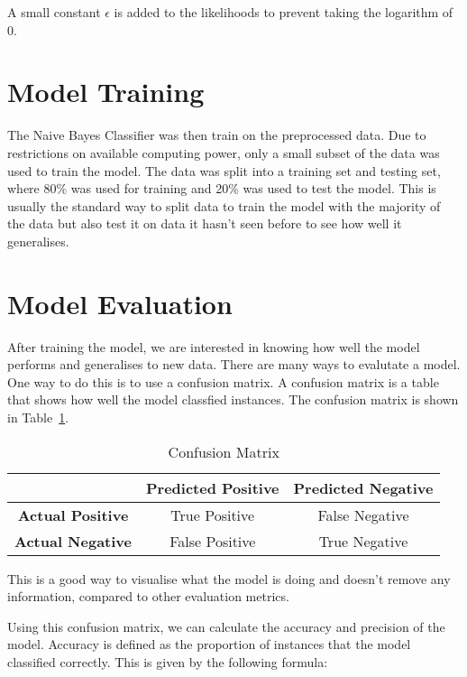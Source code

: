 A small constant $\epsilon$ is added to the likelihoods to prevent taking the logarithm of 0.


\section{Model Training}

The Naive Bayes Classifier was then train on the preprocessed data. Due to restrictions on available computing power, only a small subset of the data was used to train the model. The data was split into a training set and testing set, where 80\% was used for training and 20\% was used to test the model. This is usually the standard way to split data to train the model with the majority of the data but also test it on data it hasn't seen before to see how well it generalises.

\section{Model Evaluation}


After training the model, we are interested in knowing how well the model performs and generalises to new data. There are many ways to evalutate a model. One way to do this is to use a confusion matrix. A confusion matrix is a table that shows how well the model classfied instances. The confusion matrix is shown in Table~\ref{tab:confusion_matrix}.

\begin{table}[h]
    \centering
    \begin{tabular}{|c|c|c|}
        \hline
        \textbf{} & \textbf{Predicted Positive} & \textbf{Predicted Negative} \\
        \hline
        \textbf{Actual Positive} & True Positive & False Negative \\
        \textbf{Actual Negative} & False Positive & True Negative \\
        \hline
    \end{tabular}
    \caption{Confusion Matrix}
    \label{tab:confusion_matrix}
\end{table}

This is a good way to visualise what the model is doing and doesn't remove any information, compared to other evaluation metrics. 

Using this confusion matrix, we can calculate the accuracy and precision of the model. Accuracy is defined as the proportion of instances that the model classified correctly. This is given by the following formula:


